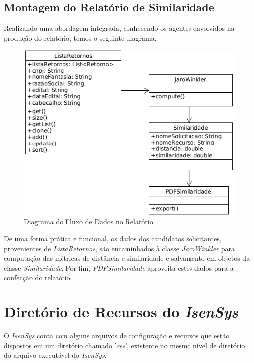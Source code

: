 \documentclass[
	12pt,			%
	openright,		%
	oneside,	
	a4paper,		%
	english,		%
	brazil			%
]{abntex2/abntex2}  %
\begin{document}
			\subsection{Montagem do Relatório de Similaridade}
			
				Realizando uma abordagem integrada, conhecendo os agentes envolvidos na produção do relatório, temos o seguinte diagrama.
				
				\begin{figure}[ht]
					\begin{center}
						
						\caption{Diagrama do Fluxo de Dados no Relatório}
						\includegraphics[scale=0.65]{img/jaro-winkler-uml}
						
					\end{center}
				\end{figure}
				
				De uma forma prática e funcional, os dados dos candidatos solicitantes, provenientes de \textit{ListaRetornos}, são encaminhados à classe \textit{JaroWinkler} para computação das métricas de distância e similaridade e salvamento em objetos da classe \textit{Similaridade}. Por fim, \textit{PDFSimilaridade} aproveita estes dados para a confecção do relatório.

		\section{Diretório de Recursos do \textit{IsenSys}} \label{recursos}
		
			O \textit{IsenSys} conta com alguns arquivos de configuração e recursos que estão dispostos em um diretório chamado '\textit{res}', existente no mesmo nível de diretório do arquivo executável do \textit{IsenSys}.
			
\end{document}
